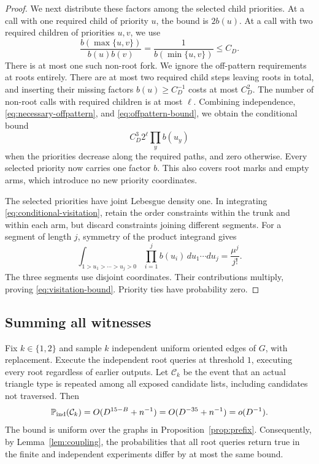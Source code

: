 \begin{proof}
We next distribute these factors among the selected child priorities.
At a call with one required child of priority $u$, the bound is $2b(u)$.
At a call with two required children of priorities $u,v$, we use
\[
 \frac{b(\max\{u,v\})}{b(u)b(v)}
 =\frac{1}{b(\min\{u,v\})}\leq C_D.
\]
There is at most one such non-root fork. We ignore the off-pattern
requirements at roots entirely. There are at most two required child
steps leaving roots in total, and inserting their missing factors
$b(u)\geq C_D^{-1}$ costs at most $C_D^2$.
The number of non-root calls with required children is at most $\ell$.
Combining independence, \eqref{eq:necessary-offpattern}, and
\eqref{eq:offpattern-bound}, we obtain the conditional bound
\begin{equation}\label{eq:conditional-visitation}
 C_D^3 2^\ell\prod_y b(u_y)
\end{equation}
when the priorities decrease along the required paths, and zero
otherwise. Every selected priority now carries one factor $b$.
This also covers root marks and empty arms, which introduce no new
priority coordinates.

The selected priorities have joint Lebesgue density one. In integrating
\eqref{eq:conditional-visitation}, retain the order constraints within
the trunk and within each arm, but discard constraints joining different
segments. For a segment of length $j$, symmetry of the product integrand
gives
\[
 \int_{1>u_1>\cdots>u_j>0}\prod_{i=1}^j b(u_i)\,du_1\cdots du_j
 =\frac{\mu^j}{j!}.
\]
The three segments use disjoint coordinates. Their contributions
multiply, proving \eqref{eq:visitation-bound}. Priority ties have
probability zero.
\end{proof}

\subsection{Summing all witnesses}

\begin{proposition}\label{prop:collision}
Fix $k\in\{1,2\}$ and sample $k$ independent uniform oriented edges of
$G$, with replacement. Execute the independent root queries at threshold
$1$, executing every root regardless of earlier outputs. Let
$\mathcal C_k$ be the event that an actual triangle type is repeated among
all exposed candidate lists, including candidates not traversed. Then
\begin{equation}\label{eq:collision-bound}
 \mathbb P_{\mathrm{ind}}(\mathcal C_k)
 =O(D^{15-B}+n^{-1})
 =O(D^{-35}+n^{-1})
 =o(D^{-1}).
\end{equation}
The bound is uniform over the graphs in Proposition~\ref{prop:prefix}.
Consequently, by Lemma~\ref{lem:coupling}, the probabilities that all root
queries return true in the finite and independent experiments differ
by at most the same bound.
\end{proposition}

